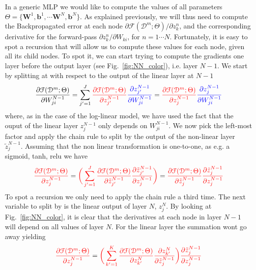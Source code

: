 In a generic MLP we would like to compute the values of all parameters $\Theta=\{\mathbf{W}^1, \mathbf{b}^1, \cdots \mathbf{W}^N, \mathbf{b}^N\}$. As explained previously, we will thus need to compute the Backpropagated error at each node $\partial \mathcal{F}(\mathcal{D}^m;\Theta)/\partial z_k^n$, and the corresponding derivative for the forward-pass $\partial z_k^n/\partial W_{ki}$, for $n = 1 \cdots N$. Fortunately, it is easy to spot a recursion that will allow us to compute these values for each node, given all its child nodes. To spot it, we can start trying to compute the gradients one layer before the output layer (see Fig.~\ref{fig:NN_color}), i.e. layer $N-1$. We start by splitting at with respect to the output of the linear layer at $N-1$
%
\begin{align}
        \frac{\partial \mathcal{F}(\mathcal{D}^m;\Theta)}{\partial W_{ji}^{N-1}} = \sum_{j'=1}^{J} {\color{red} \frac{\partial \mathcal{F}(\mathcal{D}^m;\Theta)}{\partial z_{j'}^{N-1}}} {\color{blue} \frac{\partial z_{j'}^{N-1}}{\partial W_{ji}^{N-1}}} = {\color{red} \frac{\partial \mathcal{F}(\mathcal{D}^m;\Theta)}{\partial z_{j}^{N-1}}} {\color{blue} \frac{\partial z_{j}^{N-1}}{\partial W_{ji}^{N-1}}}
\label{eq:BPderivation1}
\end{align}
%
where, as in the case of the log-linear model, we have used the fact that the ouput of the linear layer $z_j^{N-1}$ only depends on $W_{ji}^{N-1}$. We now pick the left-most factor and apply the chain rule to split by the output of the non-linear layer $\tilde{z}_j^{N-1}$. Assuming that the non linear transformation is one-to-one, as e.g. a sigmoid, tanh, relu we have
%
\begin{align}
        {\color{red} \frac{\partial \mathcal{F}(\mathcal{D}^m;\Theta)}{\partial z_{j}^{N-1}}} = {\color{red} \bigg(\sum_{j'=1}^{J} \frac{\partial \mathcal{F}(\mathcal{D}^m;\Theta)}{\partial \tilde{z}_{j'}^{N-1}} \frac{\partial \tilde{z}_{j'}^{N-1}}{\partial z_{j}^{N-1}}\bigg)} = {\color{red} \frac{\partial \mathcal{F}(\mathcal{D}^m;\Theta)}{\partial \tilde{z}_{j}^{N-1}} \frac{\partial \tilde{z}_{j}^{N-1}}{\partial z_{j}^{N-1}}}
\label{eq:BPderivation2}
\end{align}
%
To spot a recursion we only need to apply the chain rule a third time. The next variable to split by is the linear output of layer $N$, $z_j^{N}$. By looking at Fig.~\ref{fig:NN_color}, it is clear that the derivatives at each node in layer $N-1$ will depend on all values of layer $N$. For the linear layer the summation wont go away yielding
%
\begin{align}
        {\color{red} \frac{\partial \mathcal{F}(\mathcal{D}^m;\Theta)}{\partial z_{j}^{N-1}}} = {\color{red} \bigg(\sum_{k'=1}^{K} \frac{\partial \mathcal{F}(\mathcal{D}^m;\Theta)}{\partial z_{k'}^{N}} \frac{\partial z_{k'}^{N}}{\partial \tilde{z}_{j}^{N-1}}\bigg)\frac{\partial \tilde{z}_{j}^{N-1}}{\partial z_{j}^{N-1}}}
\label{eq:BPderivation3}
\end{align}
